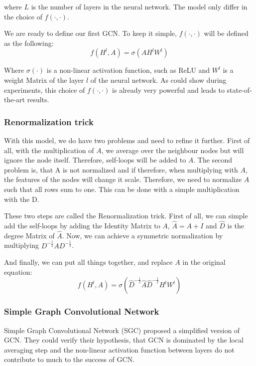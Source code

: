 where $L$ is the number of layers in the neural network.
The model only differ in the choice of $f(\cdot,\cdot)$.

We are ready to define our first GCN. To keep it simple, $f(\cdot,\cdot)$ will be defined as the following:
\begin{equation}
    f( H^l, A) = \sigma (A H^l W^l)
\end{equation} 

Where $\sigma ( \cdot )$ is a non-linear activation function, such as ReLU and $W^l$ is
a weight Matrix of the layer $l$ of the neural network. As \citet{GCN} could show during experiments,
this choice of $f(\cdot,\cdot)$ is already very powerful and leads to state-of-the-art results.

\subsubsection{Renormalization trick}

With this model, we do have two problems and need to refine it further.
First of all, with the multiplication of $A$, we average over the neighbour nodes but
will ignore the node itself. Therefore, self-loops will be added to $A$.
The second problem is, that A is not normalized and if therefore, when multiplying with $A$,
the features of the nodes will change it scale. Therefore, we need to normalize $A$
such that all rows sum to one. This can be done with a simple multiplication with the D.

These two steps are called the Renormalization trick\cite{GCN}.
First of all, we can simple add the self-loops by adding the Identity Matrix to $A$, 
$\hat{A} = A + I$ and $\hat{D}$ is the degree Matrix of $\hat{A}$.
Now, we can achieve a symmetric normalization by multiplying $D^{-\frac{1}{2}} A D^{-\frac{1}{2}}$.

And finally, we can put all things together, and replace $A$ in the original equation:
\begin{equation}
    f( H^l, A) = \sigma (\hat{D}^{-\frac{1}{2}} \hat{A} \hat{D}^{-\frac{1}{2}} H^l W^l)
\end{equation} 


\subsubsection{Simple Graph Convolutional Network}
Simple Graph Convolutional Network (SGC) \cite{simpleGCN} proposed a simplified version of GCN.
They could verify their hypothesis, that GCN is dominated by the local averaging step and the non-linear 
activation function between layers do not contribute to much to the success of GCN.

